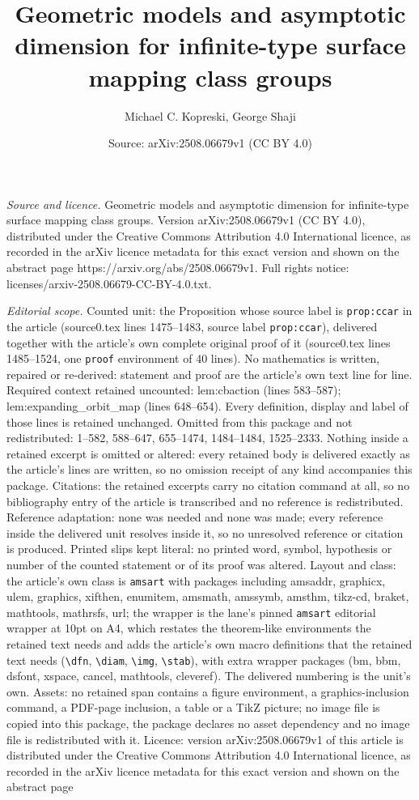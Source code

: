 \documentclass[10pt,a4paper]{amsart}
\title[Geometric models and asymptotic dimension for infinite-type ]{Geometric models and asymptotic dimension for infinite-type surface mapping class groups}
\author{Michael C. Kopreski, George Shaji}
\date{Source: arXiv:2508.06679v1 (CC BY 4.0)}
\begin{document}
\maketitle

\noindent\emph{Source and licence.} Geometric models and asymptotic dimension for infinite-type surface mapping class groups. Version arXiv:2508.06679v1 (CC BY 4.0), distributed under the Creative Commons Attribution 4.0 International licence, as recorded in the arXiv licence metadata for this exact version and shown on the abstract page https://arxiv.org/abs/2508.06679v1. Full rights notice: licenses/arxiv-2508.06679-CC-BY-4.0.txt.\par\smallskip

\noindent\textit{Editorial scope.} Counted unit: the Proposition whose source label is \texttt{prop:ccar} in the article (source0.tex lines 1475--1483, source label \texttt{prop:ccar}), delivered together with the article's own complete original proof of it (source0.tex lines 1485--1524, one \texttt{proof} environment of 40 lines). No mathematics is written, repaired or re-derived: statement and proof are the article's own text line for line. Required context retained uncounted: lem:cbaction (lines 583--587); lem:expanding\_orbit\_map (lines 648--654). Every definition, display and label of those lines is retained unchanged. Omitted from this package and not redistributed: 1--582, 588--647, 655--1474, 1484--1484, 1525--2333. Nothing inside a retained excerpt is omitted or altered: every retained body is delivered exactly as the article's lines are written, so no omission receipt of any kind accompanies this package. Citations: the retained excerpts carry no citation command at all, so no bibliography entry of the article is transcribed and no reference is redistributed. Reference adaptation: none was needed and none was made; every reference inside the delivered unit resolves inside it, so no unresolved reference or citation is produced. Printed slips kept literal: no printed word, symbol, hypothesis or number of the counted statement or of its proof was altered. Layout and class: the article's own class is \texttt{amsart} with packages including amsaddr, graphicx, ulem, graphics, xifthen, enumitem, amsmath, amssymb, amsthm, tikz-cd, braket, mathtools, mathrsfs, url; the wrapper is the lane's pinned \texttt{amsart} editorial wrapper at 10pt on A4, which restates the theorem-like environments the retained text needs and adds the article's own macro definitions that the retained text needs (\texttt{\textbackslash dfn}, \texttt{\textbackslash diam}, \texttt{\textbackslash img}, \texttt{\textbackslash stab}), with extra wrapper packages (bm, bbm, dsfont, xspace, cancel, mathtools, cleveref). The delivered numbering is the unit's own. Assets: no retained span contains a figure environment, a graphics-inclusion command, a PDF-page inclusion, a table or a TikZ picture; no image file is copied into this package, the package declares no asset dependency and no image file is redistributed with it. Licence: version arXiv:2508.06679v1 of this article is distributed under the Creative Commons Attribution 4.0 International licence, as recorded in the arXiv licence metadata for this exact version and shown on the abstract page 
\end{document}
